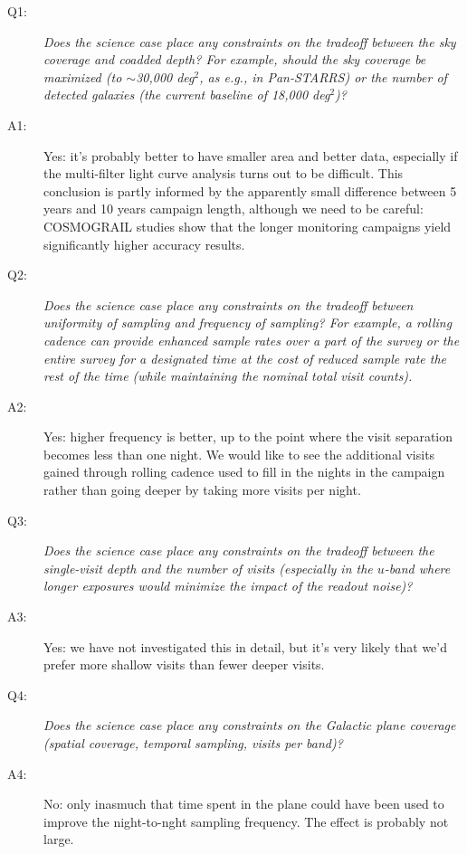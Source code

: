 \begin{description}

\item[Q1:] {\it Does the science case place any constraints on the
tradeoff between the sky coverage and coadded depth? For example, should
the sky coverage be maximized (to $\sim$30,000 deg$^2$, as e.g., in
Pan-STARRS) or the number of detected galaxies (the current baseline 
of 18,000 deg$^2$)?}

\item[A1:] Yes: it's probably better to have smaller area and better
data, especially if the multi-filter light curve analysis turns out to
be difficult. This conclusion is partly informed by the apparently small
difference between 5 years and 10 years campaign length, although we
need to be careful: COSMOGRAIL studies show that the longer monitoring
campaigns yield significantly higher accuracy results.

\item[Q2:] {\it Does the science case place any constraints on the
tradeoff between uniformity of sampling and frequency of sampling? For
example, a rolling cadence can provide enhanced sample rates over a part
of the survey or the entire survey for a designated time at the cost of
reduced sample rate the rest of the time (while maintaining the nominal
total visit counts).}

\item[A2:] Yes: higher frequency is better, up to the point where the
visit separation becomes less than one night. We would like to see the
additional visits gained through rolling cadence used to fill in the
nights in the campaign rather than going deeper by taking more visits
per night.

\item[Q3:] {\it Does the science case place any constraints on the
tradeoff between the single-visit depth and the number of visits
(especially in the $u$-band where longer exposures would minimize the
impact of the readout noise)?}

\item[A3:] Yes: we have not investigated this in detail, but it's very
likely that we'd prefer more shallow visits than fewer deeper visits.

\item[Q4:] {\it Does the science case place any constraints on the
Galactic plane coverage (spatial coverage, temporal sampling, visits per
band)?}

\item[A4:] No: only inasmuch that time spent in the plane could have
been used to improve the night-to-nght sampling frequency. The effect is
probably not large.


\end{description}
